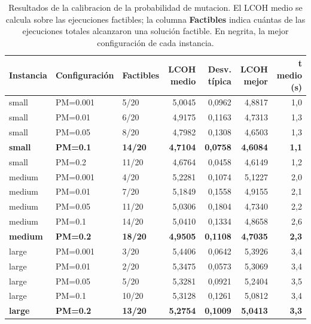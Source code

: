 \begin{table}[H]
    \centering
    \small
    \renewcommand{\arraystretch}{1.25}
    \begin{tabular}{lllrrrr}
        \hline
        \textbf{Instancia} & \textbf{Configuración} & \textbf{Factibles} & \textbf{LCOH medio} & \textbf{Desv. típica} & \textbf{LCOH mejor} & \textbf{t medio (s)} \\
        \hline
        small & PM=0.001 & 5/20 & 5,0045 & 0,0962 & 4,8817 & 1,0 \\
        small & PM=0.01 & 6/20 & 4,9175 & 0,1163 & 4,7313 & 1,3 \\
        small & PM=0.05 & 8/20 & 4,7982 & 0,1308 & 4,6503 & 1,3 \\
        \textbf{small} & \textbf{PM=0.1} & \textbf{14/20} & \textbf{4,7104} & \textbf{0,0758} & \textbf{4,6084} & \textbf{1,1} \\
        small & PM=0.2 & 11/20 & 4,6764 & 0,0458 & 4,6149 & 1,2 \\
        \hline
        medium & PM=0.001 & 4/20 & 5,2281 & 0,1074 & 5,1227 & 2,0 \\
        medium & PM=0.01 & 7/20 & 5,1849 & 0,1558 & 4,9155 & 2,1 \\
        medium & PM=0.05 & 11/20 & 5,0306 & 0,1804 & 4,7340 & 2,2 \\
        medium & PM=0.1 & 14/20 & 5,0410 & 0,1334 & 4,8658 & 2,6 \\
        \textbf{medium} & \textbf{PM=0.2} & \textbf{18/20} & \textbf{4,9505} & \textbf{0,1108} & \textbf{4,7035} & \textbf{2,3} \\
        \hline
        large & PM=0.001 & 3/20 & 5,4406 & 0,0642 & 5,3926 & 3,4 \\
        large & PM=0.01 & 2/20 & 5,3475 & 0,0573 & 5,3069 & 3,4 \\
        large & PM=0.05 & 5/20 & 5,3281 & 0,0921 & 5,2404 & 3,5 \\
        large & PM=0.1 & 10/20 & 5,3128 & 0,1261 & 5,0812 & 3,4 \\
        \textbf{large} & \textbf{PM=0.2} & \textbf{13/20} & \textbf{5,2754} & \textbf{0,1009} & \textbf{5,0413} & \textbf{3,3} \\
        \hline
    \end{tabular}
    \caption{Resultados de la calibracion de la probabilidad de mutacion. El LCOH medio se calcula sobre las ejecuciones factibles; la columna \textbf{Factibles} indica cuántas de las ejecuciones totales alcanzaron una solución factible. En negrita, la mejor configuración de cada instancia.}
    \label{tab:calib_e01_pm}
\end{table}
